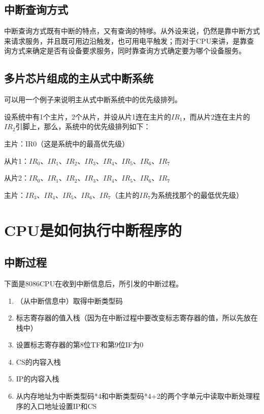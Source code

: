 \documentclass[UTF8]{ctexart}
\begin{document}
\subsection{中断查询方式}
中断查询方式既有中断的特点，又有查询的特嗲。从外设来说，仍然是靠中断方式来请求服务，并且既可用边沿触发，也可用电平触发；而对于CPU来讲，是靠查询方式来确定是否有设备要求服务，同时靠查询方式确定要为哪个设备服务。
\subsection{多片芯片组成的主从式中断系统}
可以用一个例子来说明主从式中断系统中的优先级排列。\par
设系统中有1个主片，2个从片，并设从片1连在主片的$IR_1$，而从片2连在主片的$IR_2$引脚上，那么，系统中的优先级排列如下：\par
主片：IR0（这是系统中的最高优先级）\par
从片1：$IR_0$、$IR_1$、$IR_2$、$IR_3$、$IR_4$、$IR_5$、$IR_6$、$IR_7$\par
从片2：$IR_0$、$IR_1$、$IR_2$、$IR_3$、$IR_4$、$IR_5$、$IR_6$、$IR_7$\par
主片：$IR_3$、$IR_4$、$IR_5$、$IR_6$、$IR_7$（主片的$IR_7$为系统找那个的最低优先级）
\section{CPU是如何执行中断程序的}
\subsection{中断过程}
下面是8086CPU在收到中断信息后，所引发的中断过程。
\begin{enumerate}[(1)]
  \item （从中断信息中）取得中断类型码
  \item 标志寄存器的值入栈（因为在中断过程中要改变标志寄存器的值，所以先放在栈中）
  \item 设置标志寄存器的第8位TF和第9位IF为0
  \item CS的内容入栈
  \item IP的内容入栈
  \item 从内存地址为中断类型码*4和中断类型码*4+2的两个字单元中读取中断处理程序的入口地址设置IP和CS
\end{enumerate}
\end{document}
